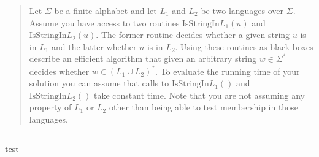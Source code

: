 \documentclass[11pt]{article}
\newcommand{\IsSinlang}[1]{\text{IsStringIn}L_{#1}}
\begin{document}

\begin{quote}
    Let $\Sigma$ be a finite alphabet and let $L_1$ and $L_2$ be two
  languages over $\Sigma$. Assume you have access to two routines
  $\IsSinlang{1}(u)$ and $\IsSinlang{2}(u)$. The former routine
  decides whether a given string $u$ is in $L_1$ and the latter
  whether $u$ is in $L_2$. Using these routines as black boxes
  describe an efficient algorithm that given an arbitrary string
  $w \in \Sigma^*$ decides whether $w \in (L_1 \cup L_2)^*$. To
  evaluate the running time of your solution you can assume that calls
  to $\IsSinlang{1}()$ and $\IsSinlang{2}()$ take constant time. Note
  that you are not assuming any property of $L_1$ or $L_2$ other than
  being able to test membership in those languages.
\end{quote}
\hrule



\begin{solution}
test
\end{solution}

\end{document}
